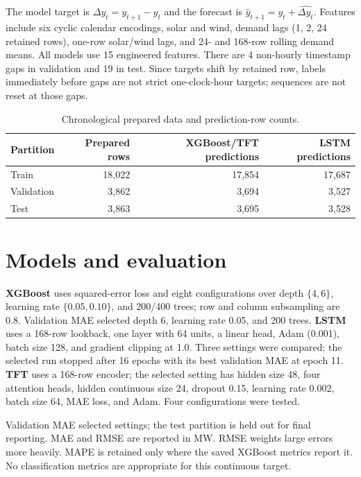 \documentclass[12pt,a4paper]{article}
\begin{document}
The model target is $\Delta y_t=y_{t+1}-y_t$ and the forecast is $\hat y_{t+1}=y_t+\widehat{\Delta y_t}$. Features include six cyclic calendar encodings, solar and wind, demand lags (1, 2, 24 retained rows), one-row solar/wind lags, and 24- and 168-row rolling demand means. All models use 15 engineered features. There are 4 non-hourly timestamp gaps in validation and 19 in test. Since targets shift by retained row, labels immediately before gaps are not strict one-clock-hour targets; sequences are not reset at those gaps.

\begin{table}[H]\centering\caption{Chronological prepared data and prediction-row counts.}\begin{tabular}{lrrr}\toprule Partition & Prepared rows & XGBoost/TFT predictions & LSTM predictions\\\midrule Train &18,022&17,854&17,687\\ Validation&3,862&3,694&3,527\\ Test&3,863&3,695&3,528\\\bottomrule\end{tabular}\end{table}
\section{Models and evaluation}
\textbf{XGBoost} uses squared-error loss and eight configurations over depth $\{4,6\}$, learning rate $\{0.05,0.10\}$, and 200/400 trees; row and column subsampling are 0.8. Validation MAE selected depth 6, learning rate 0.05, and 200 trees. \textbf{LSTM} uses a 168-row lookback, one layer with 64 units, a linear head, Adam (0.001), batch size 128, and gradient clipping at 1.0. Three settings were compared; the selected run stopped after 16 epochs with its best validation MAE at epoch 11. \textbf{TFT} uses a 168-row encoder; the selected setting has hidden size 48, four attention heads, hidden continuous size 24, dropout 0.15, learning rate 0.002, batch size 64, MAE loss, and Adam. Four configurations were tested.

Validation MAE selected settings; the test partition is held out for final reporting. MAE and RMSE are reported in MW. RMSE weights large errors more heavily. MAPE is retained only where the saved XGBoost metrics report it. No classification metrics are appropriate for this continuous target.
\end{document}
